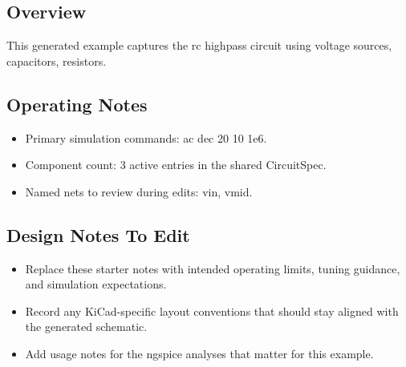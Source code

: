 \subsection*{Overview}
This generated example captures the rc highpass circuit using voltage sources, capacitors, resistors.

\subsection*{Operating Notes}
\begin{itemize}
  \item Primary simulation commands: ac dec 20 10 1e6.
  \item Component count: 3 active entries in the shared CircuitSpec.
  \item Named nets to review during edits: vin, vmid.
\end{itemize}
\subsection*{Design Notes To Edit}
\begin{itemize}
  \item Replace these starter notes with intended operating limits, tuning guidance, and simulation expectations.
  \item Record any KiCad-specific layout conventions that should stay aligned with the generated schematic.
  \item Add usage notes for the ngspice analyses that matter for this example.
\end{itemize}
